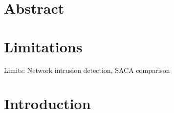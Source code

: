 \documentclass[12pt]{article} %
\begin{document}






\newpage %
\tableofcontents
\newpage





\section{Abstract}

\section{Limitations}

Limits: Network intrusion detection, SACA comparison 

\section{Introduction}
\end{document}
